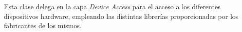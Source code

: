 \documentclass[conference]{IEEEtran}
\begin{document}
Esta clase delega en la capa \textit{Device Access} para el acceso a los diferentes dispositivos hardware, empleando las distintas librerías proporcionadas por los fabricantes de los mismos.







\end{document}
